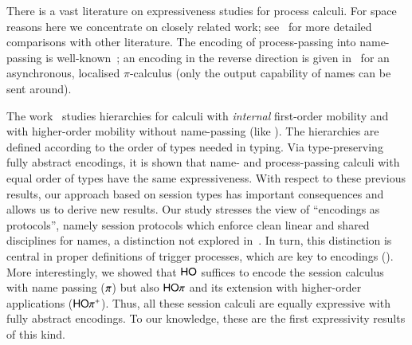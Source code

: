 
There is a vast literature on expressiveness studies for process calculi. 
For space reasons here we concentrate on closely related work; 
see~\cite{KouzapasPY15} for more detailed comparisons with other literature. 
%
The encoding of process-passing into name-passing is well-known~\cite{SangiorgiD:expmpa};
an encoding in the reverse direction 
is given in~\cite{SaWabook} for an asynchronous, localised $\pi$-calculus
(only the output capability of names can be sent around).  

The
work~\cite{San96int} studies hierarchies for calculi with
\emph{internal} first-order mobility and with higher-order mobility
without name-passing (like \HO). The
hierarchies are %
defined according to
the order of types needed in typing. 
Via type-preserving fully abstract encodings, it is shown that 
name- and process-passing calculi with equal order of types have the
same expressiveness.  With respect to these previous results, our
approach based on session types has important consequences and
allows us to derive new results.  
Our study stresses the 
view of ``encodings as protocols'', namely session protocols which
enforce clean linear and shared disciplines for names, a distinction
not explored in~\cite{SangiorgiD:expmpa,DBLP:journals/tcs/Sangiorgi01}. In
turn, this distinction is central in proper definitions
of trigger processes, which are key to encodings
(). %
More interestingly, we showed that
$\mathsf{HO}$ suffices to encode  the session
calculus with name passing ($\pi$) but also $\mathsf{HO}\pi$ and its extension with
higher-order applications ($\mathsf{HO\pi^{+}}$). 
Thus, %
all these session calculi are equally expressive with fully
abstract encodings.  To our knowledge, these are the first
expressivity results of this kind.

